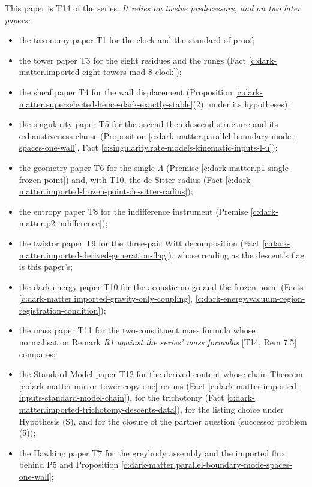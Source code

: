 \documentclass[11pt]{article}
\theoremstyle{definition}
\theoremstyle{plain}
\begin{document}
\label{c:note.dark-matter.setting-position-series}
This paper is T14 of the series. \emph{It relies on twelve predecessors, and on two later papers:}
\begin{itemize} 
\item the taxonomy paper T1 \cite{ButlerT1} for the clock and the standard of proof;
\item the tower paper T3 \cite{ButlerT3} for the eight residues and the rungs (Fact \ref{c:dark-matter.imported-eight-towers-mod-8-clock});
\item the sheaf paper T4 \cite{ButlerT4} for the wall displacement (Proposition \ref{c:dark-matter.superselected-hence-dark-exactly-stable}(2), under its hypotheses);
\item the singularity paper T5 \cite{ButlerT5} for the ascend-then-descend structure and its exhaustiveness clause (Proposition \ref{c:dark-matter.parallel-boundary-mode-spaces-one-wall}, Fact \ref{c:singularity.rate-models-kinematic-inputs-l-u});
\item the geometry paper T6 \cite{ButlerT6} for the single $\Lambda$ (Premise \ref{c:dark-matter.p1-single-frozen-point}) and, with T10, the de Sitter radius (Fact \ref{c:dark-matter.imported-frozen-point-de-sitter-radius});
\item the entropy paper T8 \cite{ButlerT8} for the indifference instrument (Premise \ref{c:dark-matter.p2-indifference});
\item the twistor paper T9 \cite{ButlerT9} for the three-pair Witt decomposition (Fact \ref{c:dark-matter.imported-derived-generation-flag}), whose reading as the descent's flag is this paper's;
\item the dark-energy paper T10 \cite{ButlerT10} for the acoustic no-go and the frozen norm (Facts \ref{c:dark-matter.imported-gravity-only-coupling}, \ref{c:dark-energy.vacuum-region-registration-condition});
\item the mass paper T11 \cite{ButlerT11} for the two-constituent mass formula whose normalisation Remark \emph{R1 against the series' mass formulas} [T14, Rem 7.5] compares;
\item the Standard-Model paper T12 \cite{ButlerT12} for the derived content whose chain Theorem \ref{c:dark-matter.mirror-tower-copy-one} reruns (Fact \ref{c:dark-matter.imported-inputs-standard-model-chain}), for the trichotomy (Fact \ref{c:dark-matter.imported-trichotomy-descents-data}), for the listing choice under Hypothesis (S), and for the closure of the partner question (successor problem (5));
\item the Hawking paper T7 \cite{ButlerT7} for the greybody assembly and the imported flux behind P5 and Proposition \ref{c:dark-matter.parallel-boundary-mode-spaces-one-wall};

\end{itemize}
\end{document}
